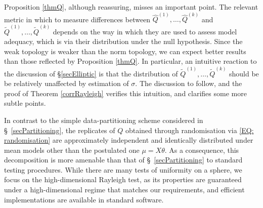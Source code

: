 \documentclass[10pt, reqno]{amsart}
\numberwithin{equation}{section}
\begin{document}
Proposition \ref{thmQ}, although reassuring, misses an important point. The relevant metric in which to measure differences between $\hat Q^{(1)},\ldots, \hat Q^{(k)}$ and $\tilde Q^{(1)},\ldots, \tilde Q^{(k)}$ depends on the way in which they are used to assess model adequacy, which is via their distribution under the null hypothesis. Since the weak topology is weaker than the norm topology, we can expect better results than those reflected by Proposition \ref{thmQ}. In particular, an intuitive reaction to the discussion of \S \ref{secElliptic} is that the distribution of $\tilde Q^{(1)},\ldots, \tilde Q^{(k)}$ should be be relatively unaffected by estimation of $\sigma$. The discussion to follow, and the proof of Theorem \ref{corrRayleigh} verifies this intuition, and clarifies some more subtle points.




In contrast to the simple data-partitioning scheme considered in \S~\ref{secPartitioning}, the replicates of $Q$ obtained through randomisation via \eqref{EQ: randomisation} are approximately independent and identically distributed  under mean models other than the postulated one $\mu = X\theta$. As a consequence, this decomposition is more amenable than that of \S~\ref{secPartitioning} to standard testing procedures. While there are many tests of uniformity on a sphere, we focus on the high-dimensional Rayleigh test, as its properties are guaranteed under a high-dimensional regime that matches our requirements, and efficient implementations are available in standard software. 
\end{document}
